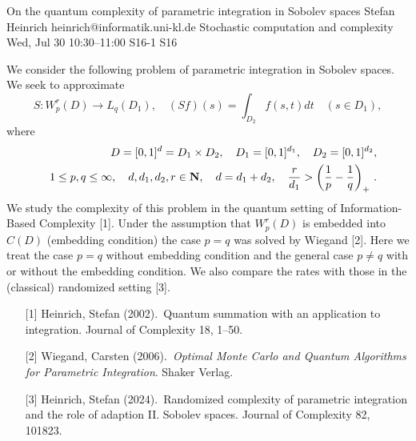 \begin{talk}
  {On the quantum complexity of parametric integration in Sobolev spaces}%
  {Stefan Heinrich}%
  {heinrich@informatik.uni-kl.de}%
  {Stochastic computation and complexity}%
  {}%
  {}%
  {Wed, Jul 30 10:30–11:00}%
  {S16-1}%
  {S16}%
				
			
We consider the following problem of parametric integration in Sobolev spaces. We seek to approximate
$$
S:W_p^r(D)\to L_q(D_1), \quad (Sf)(s)=\int_{D_2}f(s,t)dt \quad (s\in D_1),
$$ 
where 
%
\begin{eqnarray*}
&&D=[0,1]^d=D_1\times D_2,\quad D_1=[0,1]^{d_1}, \quad D_2=[0,1]^{d_2}, 
\\
&&1\le p,q\le \infty, \quad d,d_1,d_2,r\in {\bf N},\quad d=d_1+d_2,\quad \frac{r}{d_1}>\left(\frac{1}{p}-\frac{1}{q}\right)_+\, .
\end{eqnarray*}
%
We study the complexity of this problem in the quantum setting of Information-Based Complexity [1]. Under the assumption that $W_p^r(D)$ is embedded into $C(D)$ (embedding condition) the case $p=q$ was solved by Wiegand [2]. Here we treat the case $p=q$ without embedding condition and the general case $p\ne q$ with or without the embedding condition. We also compare the rates with those in the (classical) randomized setting [3].


\medskip

\begin{enumerate}

\item[{[1]}] Heinrich, Stefan (2002).\  Quantum summation with an application to integration. 
Journal of Complexity 18, 1--50.
\item[{[2]}] Wiegand, Carsten (2006).\ {\it Optimal Monte Carlo and Quantum Algorithms for Parametric Integration}. Shaker Verlag.
\item[{[3]}] Heinrich, Stefan (2024).\  Randomized complexity of parametric integration and
the role of adaption  II. Sobolev spaces. Journal of Complexity 82, 101823.
\end{enumerate}

\end{talk}

